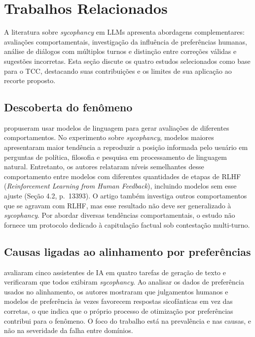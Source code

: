\chapter{Trabalhos Relacionados} \label{trabs}

A literatura sobre \textit{sycophancy} em LLMs apresenta abordagens complementares: avaliações comportamentais, investigação da influência de preferências humanas, análise de diálogos com múltiplos turnos e distinção entre correções válidas e sugestões incorretas. Esta seção discute os quatro estudos selecionados como base para o TCC, destacando suas contribuições e os limites de sua aplicação ao recorte proposto.

\section{Descoberta do fenômeno}

\textcite{perez2023discovering} propuseram usar modelos de linguagem para gerar avaliações de diferentes comportamentos. No experimento sobre \textit{sycophancy}, modelos maiores apresentaram maior tendência a reproduzir a posição informada pelo usuário em perguntas de política, filosofia e pesquisa em processamento de linguagem natural. Entretanto, os autores relataram níveis semelhantes desse comportamento entre modelos com diferentes quantidades de etapas de RLHF (\textit{Reinforcement Learning from Human Feedback}), incluindo modelos sem esse ajuste (Seção 4.2, p.~13393). O artigo também investiga outros comportamentos que se agravam com RLHF, mas esse resultado não deve ser generalizado à \textit{sycophancy}. Por abordar diversas tendências comportamentais, o estudo não fornece um protocolo dedicado à capitulação factual sob contestação multi-turno.

\section{Causas ligadas ao alinhamento por preferências}

\textcite{sharma2024towards} avaliaram cinco assistentes de IA em quatro tarefas de geração de texto e verificaram que todos exibiram \textit{sycophancy}. Ao analisar os dados de preferência usados no alinhamento, os autores mostraram que julgamentos humanos e modelos de preferência às vezes favorecem respostas sicofânticas em vez das corretas, o que indica que o próprio processo de otimização por preferências contribui para o fenômeno. O foco do trabalho está na prevalência e nas causas, e não na severidade da falha entre domínios.

